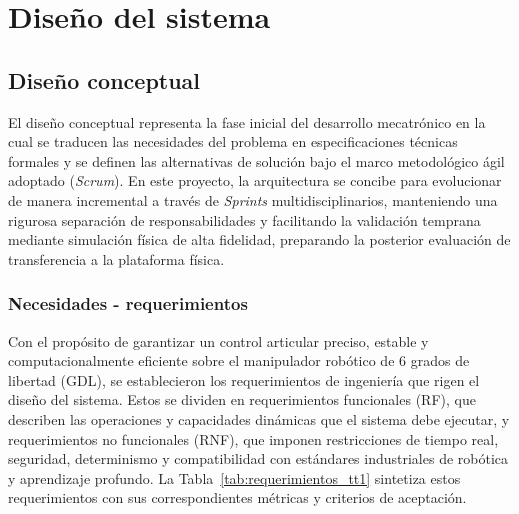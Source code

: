 \documentclass[12pt]{article}
\begin{document}
\section{Diseño del sistema}
\label{sec:diseno_sistema}

\subsection{Diseño conceptual}
\label{sec:diseno_conceptual}

El diseño conceptual representa la fase inicial del desarrollo mecatrónico en la cual se traducen las necesidades del problema en especificaciones técnicas formales y se definen las alternativas de solución bajo el marco metodológico ágil adoptado (\textit{Scrum}). En este proyecto, la arquitectura se concibe para evolucionar de manera incremental a través de \textit{Sprints} multidisciplinarios, manteniendo una rigurosa separación de responsabilidades y facilitando la validación temprana mediante simulación física de alta fidelidad, preparando la posterior evaluación de transferencia a la plataforma física.

\subsubsection{Necesidades - requerimientos}
\label{sssec:necesidades_requerimientos}

Con el propósito de garantizar un control articular preciso, estable y computacionalmente eficiente sobre el manipulador robótico de 6 grados de libertad (GDL), se establecieron los requerimientos de ingeniería que rigen el diseño del sistema. Estos se dividen en requerimientos funcionales (RF), que describen las operaciones y capacidades dinámicas que el sistema debe ejecutar, y requerimientos no funcionales (RNF), que imponen restricciones de tiempo real, seguridad, determinismo y compatibilidad con estándares industriales de robótica y aprendizaje profundo. La Tabla~\ref{tab:requerimientos_tt1} sintetiza estos requerimientos con sus correspondientes métricas y criterios de aceptación.
\end{document}
